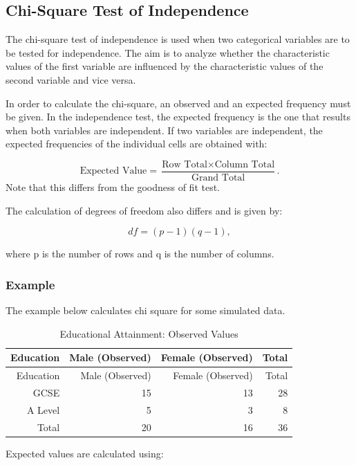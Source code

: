\documentclass[
]{book}
\begin{document}
\hypertarget{chi-square-test-of-independence}{%
\subsection{Chi-Square Test of Independence}\label{chi-square-test-of-independence}}

The chi-square test of independence is used when two categorical variables are to be tested for independence. The aim is to analyze whether the characteristic values of the first variable are influenced by the characteristic values of the second variable and vice versa.

In order to calculate the chi-square, an observed and an expected frequency must be given. In the independence test, the expected frequency is the one that results when both variables are independent. If two variables are independent, the expected frequencies of the individual cells are obtained with:

\[\textrm{Expected Value}= \frac{\textrm{Row Total} \times \textrm{Column Total}}{\textrm{Grand Total}}.\]
Note that this differs from the goodness of fit test.

The calculation of degrees of freedom also differs and is given by:

\[df=(p-1)(q-1),\]

where p is the number of rows and q is the number of columns.

\hypertarget{example-15}{%
\subsubsection{Example}\label{example-15}}

The example below calculates chi square for some simulated data.

\begin{longtable}[]{@{}rrrr@{}}
\caption{\label{tab:table12} Educational Attainment: Observed Values}\tabularnewline
\toprule
Education & Male (Observed) & Female (Observed) & Total \\
\midrule
\endfirsthead
\toprule
Education & Male (Observed) & Female (Observed) & Total \\
\midrule
\endhead
GCSE & 15 & 13 & 28 \\
A Level & 5 & 3 & 8 \\
Total & 20 & 16 & 36 \\
\bottomrule
\end{longtable}

Expected values are calculated using:
\end{document}
